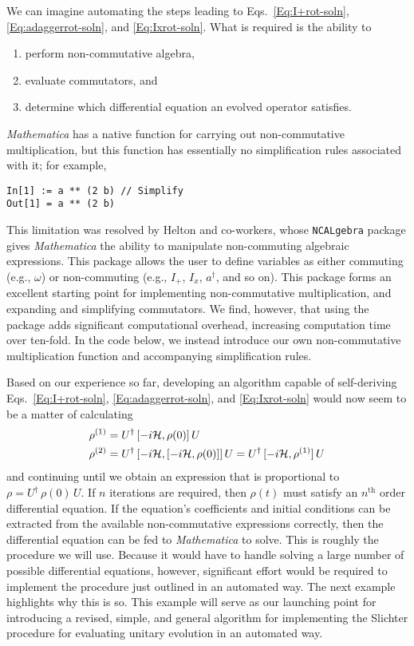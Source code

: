 We can imagine automating the steps leading to Eqs.~\ref{Eq:I+rot-soln}, \ref{Eq:adaggerrot-soln}, and \ref{Eq:Ixrot-soln}.   What is required is the ability to
\begin{enumerate}
  \item perform non-commutative algebra, 
  \item evaluate commutators, and
  \item determine which differential equation an evolved operator satisfies.
\end{enumerate}
\emph{Mathematica} has a native function for carrying out non-commutative multiplication, but this function has essentially no simplification rules associated with it; for example,
\begin{Verbatim}[xleftmargin=0.25in]
In[1] := a ** (2 b) // Simplify
Out[1] = a ** (2 b)
\end{Verbatim}
This limitation was resolved by Helton and co-workers, whose \verb+NCALgebra+ package \cite{Helton2015feb} gives \emph{Mathematica} the ability to manipulate non-commuting algebraic expressions.  This package allows the user to define variables as either commuting (e.g., $\omega$) or non-commuting (e.g., $I_+$, $I_x$, $a^{\dagger}$, and so on).  This package forms an excellent starting point for implementing non-commutative multiplication, and expanding and simplifying commutators. We find, however, that using the package adds significant computational overhead, increasing computation time over ten-fold.  In the code below, we instead introduce our own non-commutative multiplication function and accompanying simplification rules. 

Based on our experience so far, developing an algorithm capable of self-deriving Eqs.~\ref{Eq:I+rot-soln}, \ref{Eq:adaggerrot-soln}, and \ref{Eq:Ixrot-soln} would now seem to be a matter of calculating
\begin{align}
\rho^{(1)} & = U^{\dagger} \, [-i {\cal H}, \rho(0)] \, U \\
\rho^{(2)} & = U^{\dagger} \, [-i {\cal H}, [-i {\cal H}, \rho(0)]] \, U
	= U^{\dagger} \, [-i {\cal H}, \rho^{(1)}] \, U
\end{align}
and continuing until we obtain an expression that is proportional to $\rho = U^{\dagger} \, \rho(0) \, U$. If $n$ iterations are required, then $\rho(t)$ must satisfy an $n^\text{th}$ order differential equation.  If the equation's coefficients and initial conditions can be extracted from the  available non-commutative expressions correctly, then the differential equation can be fed to \emph{Mathematica} to solve.  This is roughly the procedure we will use.  Because it would have to handle solving a large number of possible differential equations, however, significant effort would be required to implement the procedure just outlined in an automated way.  The next example highlights why this is so.  This example will serve as our launching point for introducing a revised, simple, and general algorithm for implementing the Slichter procedure for evaluating unitary evolution in an automated way. 

